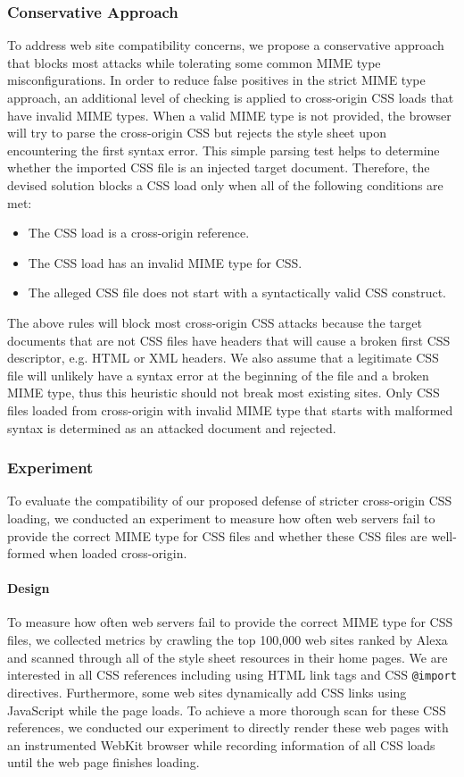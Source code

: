 \documentclass{acm_proc_article-sp}
\begin{document}
\subsubsection{Conservative Approach}
To address web site compatibility concerns, we propose a conservative approach that blocks most attacks while tolerating some common MIME type misconfigurations. In order to reduce false positives in the strict MIME type approach, an additional level of checking is applied to cross-origin CSS loads that have invalid MIME types. When a valid MIME type is not provided, the browser will try to parse the cross-origin CSS but rejects the style sheet upon encountering the first syntax error. This simple parsing test helps to determine whether the imported CSS file is an injected target document. Therefore, the devised solution blocks a CSS load only when all of the following conditions are met:
\begin{itemize}
\item{The CSS load is a cross-origin reference.}
\item{The CSS load has an invalid MIME type for CSS.}
\item{The alleged CSS file does not start with a syntactically valid CSS construct.}
\end{itemize}
The above rules will block most cross-origin CSS attacks because the target documents that are not CSS files have headers that will cause a broken first CSS descriptor, e.g. HTML or XML headers. We also assume that a legitimate CSS file will unlikely have a syntax error at the beginning of the file and a broken MIME type, thus this heuristic should not break most existing sites. Only CSS files loaded from cross-origin with invalid MIME type that starts with malformed syntax is determined as an attacked document and rejected.

\subsubsection{Experiment}
To evaluate the compatibility of our proposed defense of stricter cross-origin CSS loading, we conducted an experiment to measure how often web servers fail to provide the correct MIME type for CSS files and whether these CSS files are well-formed when loaded cross-origin.

\paragraph{Design}
To measure how often web servers fail to provide the correct MIME type for CSS files, we collected metrics by crawling the top 100,000 web sites ranked by Alexa~\cite{alexa} and scanned through all of the style sheet resources in their home pages. We are interested in all CSS references including using HTML link tags and CSS \texttt{@import} directives. Furthermore, some web sites dynamically add CSS links using JavaScript while the page loads. To achieve a more thorough scan for these CSS references, we conducted our experiment to directly render these web pages with an instrumented WebKit browser while recording information of all CSS loads until the web page finishes loading.
\end{document}
